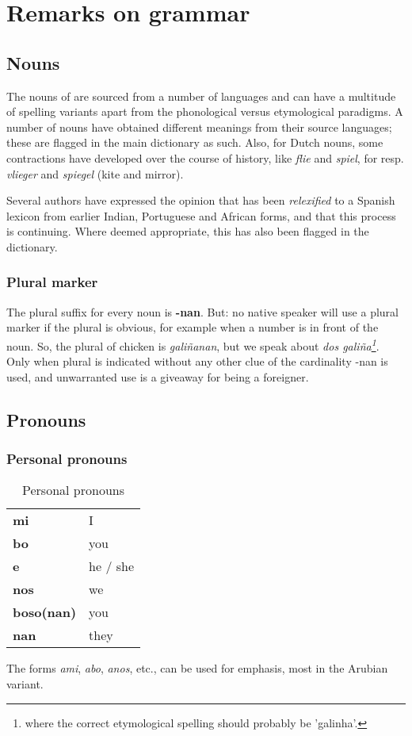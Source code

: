 \chapter{Remarks on grammar}

\section{Nouns}
The nouns of \pap{} are sourced from a number of languages and can
have a multitude of spelling variants apart from the phonological
versus etymological paradigms. A number of nouns have obtained
different meanings from their source languages; these are flagged in
the main dictionary as such. Also, for Dutch nouns, some contractions
have developed over the course of history, like \emph{flie} and
\emph{spiel}, for resp. \emph{vlieger} and \emph{spiegel} (kite and
mirror).

Several authors \cite[47]{holm1988} have expressed the opinion that \pap{} has been
\emph{relexified} to a Spanish lexicon from earlier Indian, Portuguese
and African forms, and that this process is continuing. Where deemed
appropriate, this has also been flagged in the dictionary.

\subsection{Plural marker}
The plural suffix for every noun is \textbf{-nan}. But: no native
speaker will use a plural marker if the plural is obvious, for example
when a number is in front of the noun. So, the plural of chicken is
\emph{galiñanan}, but we speak about \emph{dos galiña\footnote{where
    the correct etymological spelling should probably be 'galinha'.}}. Only when
plural is indicated without any other clue of the cardinality -nan is
used, and unwarranted use is a giveaway for being a foreigner.
 
\section{Pronouns}

\subsection{Personal pronouns}
\begin{table}[htpb]\caption{Personal pronouns}
\begin{tabularx}{\textwidth}{>{\bfseries}lX}
\toprule
mi & I\\
bo & you \\
e & he / she \\
nos & we \\
boso(nan) & you \\
nan & they \\
\bottomrule
\end{tabularx}
\end{table}
The forms \emph{ami}, \emph{abo}, \emph{anos}, etc., can be used for emphasis, most in the Arubian variant.

